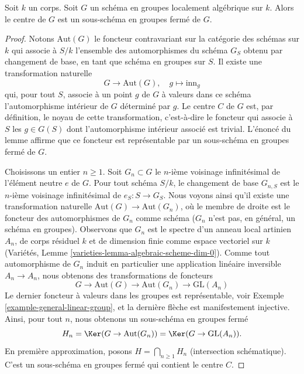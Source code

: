 \begin{lemma}
\label{lemma-algebraic-center}
Soit $k$ un corps. Soit $G$ un schéma en groupes localement algébrique sur $k$.
Alors le centre de $G$ est un sous-schéma en groupes fermé de $G$.
\end{lemma}

\begin{proof}
Notons $\text{Aut}(G)$ le foncteur contravariant sur la catégorie des
schémas sur $k$ qui associe à $S/k$ l'ensemble des automorphismes
du schéma $G_S$ obtenu par changement de base, en tant que schéma en groupes sur $S$. Il existe une transformation
naturelle
$$
G \longrightarrow \text{Aut}(G),\quad
g \longmapsto \text{inn}_g
$$
qui, pour tout $S$, associe à un point $g$ de $G$ à valeurs dans ce schéma l'automorphisme intérieur de $G$
déterminé par $g$. Le centre $C$ de $G$ est, par définition, le noyau de
cette transformation, c'est-à-dire le foncteur qui associe à $S$ les
$g \in G(S)$ dont l'automorphisme intérieur associé est trivial. L'énoncé
du lemme affirme que ce foncteur est représentable par un sous-schéma en groupes
fermé de $G$.

\medskip\noindent
Choisissons un entier $n \geq 1$. Soit $G_n \subset G$ le $n$-ième voisinage
infinitésimal de l'élément neutre $e$ de $G$. Pour tout schéma $S/k$,
le changement de base $G_{n, S}$ est le $n$-ième voisinage infinitésimal de
$e_S : S \to G_S$. Nous voyons ainsi qu'il existe une transformation naturelle
$\text{Aut}(G) \to \text{Aut}(G_n)$, où le membre de droite est le
foncteur des automorphismes de $G_n$ comme schéma ($G_n$ n'est pas, en général,
un schéma en groupes). Observons que $G_n$ est le spectre d'un anneau
local artinien $A_n$, de corps résiduel $k$ et de dimension finie
comme espace vectoriel sur $k$
(Variétés, Lemme \ref{varieties-lemma-algebraic-scheme-dim-0}).
Comme tout automorphisme de $G_n$ induit en particulier une application
linéaire inversible $A_n \to A_n$, nous obtenons des transformations de foncteurs
$$
G \to \text{Aut}(G) \to \text{Aut}(G_n) \to \text{GL}(A_n)
$$
Le dernier foncteur à valeurs dans les groupes est représentable, voir
Exemple \ref{example-general-linear-group}, et la
dernière flèche est manifestement injective.
Ainsi, pour tout $n$, nous obtenons un sous-schéma en groupes fermé
$$
H_n = \Ker(G \to \text{Aut}(G_n)) = \Ker(G \to \text{GL}(A_n)).
$$
En première approximation, posons $H = \bigcap_{n \geq 1} H_n$
(intersection schématique). C'est un sous-schéma en groupes fermé
qui contient le centre $C$.


\end{proof}
